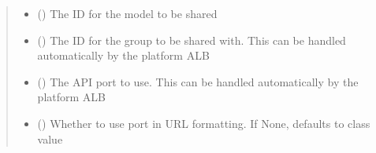 \documentclass[letterpaper,10pt,english]{sphinxmanual}
\begin{document}
\begin{fulllineitems}
\begin{fulllineitems}
\begin{sphinxVerbatim}[commandchars=\\\{\}]
 
  
 
\end{sphinxVerbatim}
\begin{quote}\begin{description}
\begin{itemize}
\item {} 
\sphinxAtStartPar
{} () \textendash{} The ID for the model to be shared

\item {} 
\sphinxAtStartPar
{} () \textendash{} The ID for the group to be shared with. This can be handled automatically by the platform ALB

\item {} 
\sphinxAtStartPar
{} (\sphinxstyleliteralemphasis{\sphinxupquote{ (}}\sphinxstyleliteralemphasis{\sphinxupquote{)}}) \textendash{} The API port to use. This can be handled automatically by the platform ALB

\item {} 
\sphinxAtStartPar
{} (\sphinxstyleliteralemphasis{\sphinxupquote{ (}}\sphinxstyleliteralemphasis{\sphinxupquote{)}}) \textendash{} Whether to use port in URL formatting. If None, defaults to class value

\end{itemize}


\end{description}
\end{quote}
\end{fulllineitems}
\end{fulllineitems}
\end{document}
